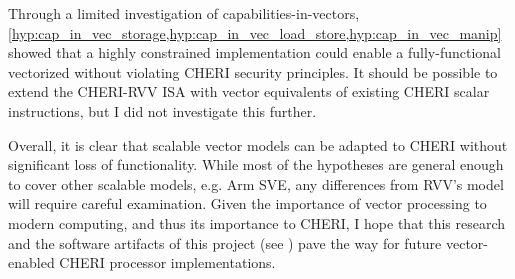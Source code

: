 \documentclass[../thesis]{subfiles}
\begin{document}
Through a limited investigation of capabilities-in-vectors, \cref{hyp:cap_in_vec_storage,hyp:cap_in_vec_load_store,hyp:cap_in_vec_manip} showed that a highly constrained implementation could enable a fully-functional vectorized  without violating CHERI security principles.
It should be possible to extend the CHERI-RVV ISA with vector equivalents of existing CHERI scalar instructions, but I did not investigate this further.

Overall, it is clear that scalable vector models can be adapted to CHERI without significant loss of functionality.
While most of the hypotheses are general enough to cover other scalable models, e.g. Arm SVE, any differences from RVV's model will require careful examination.
Given the importance of vector processing to modern computing, and thus its importance to CHERI, I hope that this research and the software artifacts of this project (see ) pave the way for future vector-enabled CHERI processor implementations.

\end{document}
